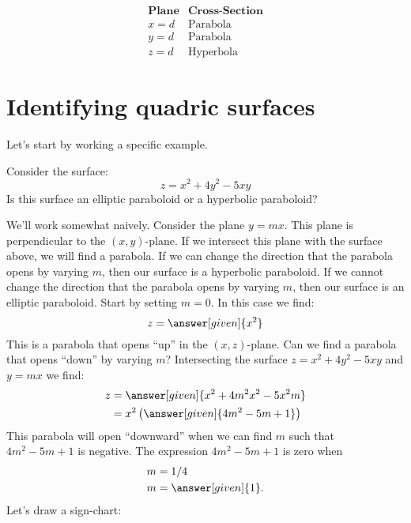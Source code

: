 \documentclass{ximera}
\begin{document}
\[
\begin{array}{cc}
\textbf{Plane}  & \textbf{Cross-Section} \\ \hline
x=d & \text{Parabola}\\
y=d & \text{Parabola}\\
z=d & \text{Hyperbola}
\end{array}
\]

\section{Identifying quadric surfaces}

Let's start by working a specific example.

\begin{example}
  Consider the surface:
  \[
  z = x^2+4y^2-5xy
  \]
  Is this surface an elliptic paraboloid or a hyperbolic paraboloid?
  \begin{explanation}
    We'll work somewhat naively. Consider the plane $y= mx$. This
    plane is perpendicular to the $(x,y)$-plane. If we intersect this
    plane with the surface above, we will find a parabola. If we can
    change the direction that the parabola opens by varying $m$, then
    our surface is a hyperbolic paraboloid. If we cannot change the
    direction that the parabola opens by varying $m$, then our surface
    is an elliptic paraboloid. Start by setting $m = 0$. In this case
    we find:
    \[
    z = \answer[given]{x^2}
    \]
    This is a parabola that opens ``up'' in the $(x,z)$-plane. Can we
    find a parabola that opens ``down'' by varying $m$? Intersecting
    the surface $z = x^2 + 4y^2 -5xy$ and $y=mx$ we find:
    \begin{align*}
      z &= \answer[given]{x^2 + 4 m^2 x^2 -5 x^2 m}\\
      &=x^2\left(\answer[given]{4 m^2-5m + 1}\right)
    \end{align*}
    This parabola will open ``downward'' when we can find $m$ such
    that $4 m^2-5m + 1$ is negative. The expression $4 m^2-5m + 1$ is zero when
    \begin{align*}
      m &= 1/4\\
      m &= \answer[given]{1}.
    \end{align*}
    Let's draw a sign-chart:
    \begin{image}
\end{image}
\end{explanation}
\end{example}
\end{document}
